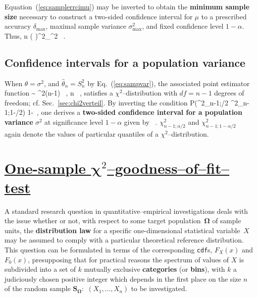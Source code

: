 \medskip
\noindent
Equation~(\ref{eq:samplerrcimu}) may be inverted to obtain the 
\textbf{minimum sample size} necessary to construct a two-sided 
confidence interval for $\mu$ to a prescribed accuracy 
$\delta_\mathrm{max}$, maximal sample variance
$\sigma_\mathrm{max}^{2}$, and fixed confidence level $1-\alpha$.
Thus,
%
\be
n \geq \left(
\right)^{2}\sigma_^{2} \ .
\ee
%

\subsection[Confidence intervals for a variance]{Confidence
intervals for a population variance}
When $\theta=\sigma^{2}$, and $\hat{\theta}_{n}=S_{n}^{2}$ by 
Eq.~(\ref{eq:sampvar}), the associated point estimator function
%
\be
{} \sim
\chi^{2}(n-1) \ ,
\quad{}\quad n \in {} \ ,
\ee
%
satisfies a $\chi^{2}$--distribution with $df=n-1$ degrees of 
freedom; cf. Sec.~\ref{sec:chi2verteil}. By inverting the 
condition
%
\be
P\left(\chi^{2}_{n-1;\alpha/2} \leq
{} \leq
\chi^{2}_{n-1;1-\alpha/2}\right) \stackrel{!}{=} 1-\alpha \ ,
\ee
%
one derives a \textbf{two-sided confidence interval for a
population variance} $\sigma^{2}$ at significance level $1-\alpha$
given by
%
\be
{} \ .
\ee
%
$\chi^{2}_{n-1;\alpha/2}$ and $\chi^{2}_{n-1;1-\alpha/2}$ again 
denote the values of particular quantiles of a 
$\chi^{2}$--distribution.

\section[One-sample $\chi^{2}$--goodness--of--fit--test]{\href{https://www.youtube.com/watch?v=EjMZdii62Fk}{One-sample
$\boldsymbol{\chi}^{2}$--goodness--of--fit--test}}
A standard research question in quantitative--empirical 
investigations deals with the issue whether or not, with respect 
to some target population~$\boldsymbol{\Omega}$ of sample units, 
the \textbf{distribution law} for a specific one-dimensional 
statistical variable~$X$ may be assumed to comply with a 
particular theoretical reference distribution. This question can 
be formulated in terms of the corresponding \texttt{cdf}s,
$F_{X}(x)$ and $F_{0}(x)$, presupposing that for practical reasons
the spectrum of values of $X$ is subdivided into a set of $k$
mutually exclusive \textbf{categories} (or \textbf{bins}), with $k$
a judiciously chosen positive integer which depends in the first
place on the size $n$ of the random sample
$\boldsymbol{S_{\Omega}}$:~$(X_{1}, \ldots, X_{n})$ to be
investigated.

